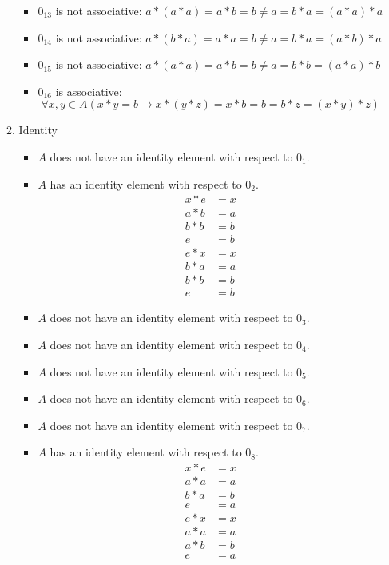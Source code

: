 \begin{enumerate}[label={\Alph*.},font={\bfseries}]
\begin{enumerate}[label={\arabic*},font={\bfseries}]
\begin{itemize}
    \item $0_{13}$ is not associative: $a*(a*a)=a*b=b \neq a=b*a=(a*a)*a$
    \item $0_{14}$ is not associative: $a*(b*a)=a*a=b \neq a=b*a=(a*b)*a$
    \item $0_{15}$ is not associative: $a*(a*a)=a*b=b \neq a=b*b=(a*a)*b$
    \item $0_{16}$ is associative:
      $$\forall x,y \in A (x*y=b \to x*(y*z)=x*b=b=b*z=(x*y)*z)$$
    \end{itemize}
  \item Identity
    \begin{itemize}
    \item $A$ does not have an identity element with respect to $0_1$.
    \item $A$ has an identity element with respect to $0_2$.
      \begin{align*}
        x*e &= x \\
        a*b &= a \\
        b*b &= b \\
        e &= b \\
        e*x &= x \\
        b*a &= a \\
        b*b &= b \\
        e &= b
      \end{align*}
    \item $A$ does not have an identity element with respect to $0_3$.
    \item $A$ does not have an identity element with respect to $0_4$.
    \item $A$ does not have an identity element with respect to $0_5$.
    \item $A$ does not have an identity element with respect to $0_6$.
    \item $A$ does not have an identity element with respect to $0_7$.
    \item $A$ has an identity element with respect to $0_8$.
      \begin{align*}
        x*e &= x \\
        a*a &= a \\
        b*a &= b \\
        e &= a \\
        e*x &= x \\
        a*a &= a \\
        a*b &= b \\
        e &= a
      \end{align*}

\end{itemize}
\end{enumerate}
\end{enumerate}
